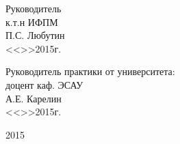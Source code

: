 \vfill

\begin{flushright}
\begin{minipage}{0.45\textwidth}
 \begin{flushleft}
  Руководитель\\
  к.т.н ИФПМ  \\
  \underline{\hspace{3cm}}П.С. Любутин\\
  <<\underline{\hspace{1cm}}>>\underline{\hspace{3cm}}2015г.\\
 \end{flushleft}
\end{minipage}
\end{flushright}

\vfill

\begin{flushright}
\begin{minipage}{0.45\textwidth}
 \begin{flushleft}
  Руководитель практики от университета: \\
  доцент каф. ЭСАУ\\
  \underline{\hspace{3cm}}А.Е. Карелин\\
  <<\underline{\hspace{1cm}}>>\underline{\hspace{3cm}}2015г.\\
 \end{flushleft}
\end{minipage}
\end{flushright}


\vfill
\begin{center}
2015
\end{center}